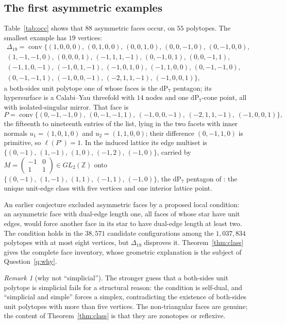 \documentclass[11pt]{amsart}
\theoremstyle{definition}
\theoremstyle{remark}
\newtheorem{remark}[theorem]{Remark}
\newcommand{\ZZ}{\mathbb{Z}}
\newcommand{\conv}{\operatorname{conv}}
\begin{document}
\subsection{The first asymmetric examples}\label{sec:refuted}
Table~\ref{tab:occ} shows that
$88$ asymmetric faces occur, on $55$ polytopes.
The smallest example has $19$ vertices:
\[
\begin{gathered}
\Delta_{19}=\conv\{(1,0,0,0),\,(0,1,0,0),\,(0,0,1,0),\,(0,0,-1,0),\,
(0,-1,0,0),\\
(1,-1,-1,0),\,(0,0,0,1),\,(-1,1,1,-1),\,(0,-1,0,1),\,(0,0,-1,1),\\
(-1,1,0,-1),\,(-1,0,1,-1),\,(-1,0,1,0),\,(-1,1,0,0),\,(0,-1,-1,0),\\
(0,-1,-1,1),\,(-1,0,0,-1),\,(-2,1,1,-1),\,(-1,0,0,1)\},
\end{gathered}
\]
a both-sides unit polytope one of whose faces is the $\mathrm{dP}_7$
pentagon; its hypersurface is a Calabi--Yau threefold with $14$ nodes and
one $\mathrm{dP}_7$-cone point, all with isolated-singular mirror.  That face
is
\[
P = \conv\bigl\{(0,-1,-1,0),\ (0,-1,-1,1),\ (-1,0,0,-1),\
(-2,1,1,-1),\ (-1,0,0,1)\bigr\},
\]
the fifteenth to nineteenth entries of the list, lying in the two facets with
inner normals $u_1 = (1,0,1,0)$ and $u_2 = (1,1,0,0)$; their difference
$(0,-1,1,0)$ is primitive, so $\ell(P^\circ) = 1$.  In the induced lattice
its edge multiset is $\{(0,-1),\,(1,-1),\,(1,0),\,(-1,2),\,(-1,0)\}$, carried
by
$M=\left(\begin{smallmatrix}-1&0\\1&1\end{smallmatrix}\right) \in GL_2(\ZZ)$
onto $\{(0,-1),\,(1,-1),\,(1,1),\,(-1,1),\,(-1,0)\}$, the
$\mathrm{dP}_7$ pentagon of \cite[Rem.~2.6]{paper1}: the unique
unit-edge class with
five vertices and one interior lattice point.

An earlier conjecture excluded asymmetric faces by a proposed local
condition: an asymmetric face with dual-edge length one, all faces of
whose star have unit edges, would force another face in its star to
have dual-edge length at least two.  The condition holds in the
$38{,}571$ candidate configurations among the $1{,}037{,}834$
polytopes with at most eight vertices, but $\Delta_{19}$ disproves it.
Theorem~\ref{thm:class} gives the complete face inventory, whose
geometric explanation is the subject of Question~\ref{q:why}.

\begin{remark}[why not ``simplicial'']\label{rem:selfdual}
The stronger guess that a both-sides unit polytope is simplicial fails for a
structural reason: the condition is self-dual, and ``simplicial and simple''
forces a simplex, contradicting the existence of both-sides unit polytopes
with more than five vertices.  The non-triangular faces are genuine; the
content of Theorem~\ref{thm:class} is that they are zonotopes or reflexive.
\end{remark}
\end{document}

